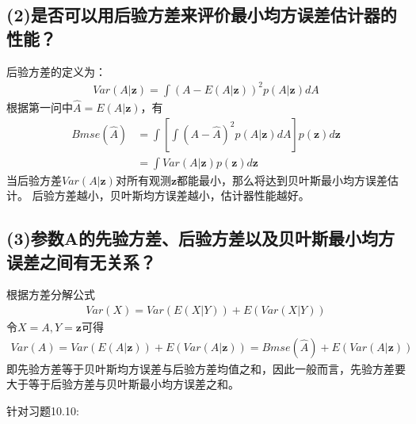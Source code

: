 \documentclass[fontset=windows]{article}
\numberwithin{figure}{section}
\begin{document}
\subsection*{(2)是否可以用后验方差来评价最小均方误差估计器的性能？}
后验方差的定义为：
\begin{align*}
	Var(A|\mathbf{z})=\int (A-E(A|\mathbf{z}))^2 p(A|\mathbf{z})dA
\end{align*}
根据第一问中\(\hat{A}=E(A|\mathbf{z})\)，有
\begin{align*}
	Bmse(\hat{A})
	 & =\int \left[\int (A-\hat{A})^2 p(A|\mathbf{z})dA\right]p(\mathbf{z})d\mathbf{z} \\
	 & =\int Var(A|\mathbf{z})p(\mathbf{z})d\mathbf{z}
\end{align*}
当后验方差\(Var(A|\mathbf{z})\)对所有观测\(\mathbf{z}\)都能最小，那么将达到贝叶斯最小均方误差估计。
后验方差越小，贝叶斯均方误差越小，估计器性能越好。

\subsection*{(3)参数A的先验方差、后验方差以及贝叶斯最小均方误差之间有无关系？}
根据方差分解公式
\begin{align*}
	Var(X)=Var(E(X|Y))+E(Var(X|Y))
\end{align*}
令\(X=A,Y=\mathbf{z}\)可得
\begin{align*}
	Var(A)=Var(E(A|\mathbf{z}))+E(Var(A|\mathbf{z}))=Bmse(\hat{A})+E(Var(A|\mathbf{z}))
\end{align*}
即先验方差等于贝叶斯均方误差与后验方差均值之和，因此一般而言，先验方差要大于等于后验方差与贝叶斯最小均方误差之和。

针对习题10.10:
\end{document}

